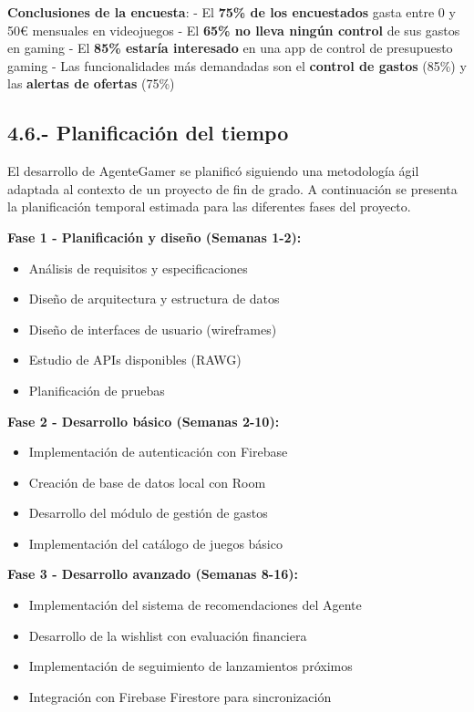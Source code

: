 \documentclass[
  spanish,
  11pt,
  paper=a4,
  ,captions=tableheading
]{scrartcl}
\providecommand{\tightlist}{%
  \setlength{\itemsep}{0pt}\setlength{\parskip}{0pt}}
\begin{document}
\textbf{Conclusiones de la encuesta}: - El \textbf{75\% de los
encuestados} gasta entre 0 y 50€ mensuales en videojuegos - El
\textbf{65\% no lleva ningún control} de sus gastos en gaming - El
\textbf{85\% estaría interesado} en una app de control de presupuesto
gaming - Las funcionalidades más demandadas son el \textbf{control de
gastos} (85\%) y las \textbf{alertas de ofertas} (75\%)

\hypertarget{planificaciuxf3n-del-tiempo}{%
\subsection{4.6.- Planificación del
tiempo}\label{planificaciuxf3n-del-tiempo}}

El desarrollo de AgenteGamer se planificó siguiendo una metodología ágil
adaptada al contexto de un proyecto de fin de grado. A continuación se
presenta la planificación temporal estimada para las diferentes fases
del proyecto.

\textbf{Fase 1 - Planificación y diseño (Semanas 1-2):}

\begin{itemize}
\tightlist
\item
  Análisis de requisitos y especificaciones
\item
  Diseño de arquitectura y estructura de datos
\item
  Diseño de interfaces de usuario (wireframes)
\item
  Estudio de APIs disponibles (RAWG)
\item
  Planificación de pruebas
\end{itemize}

\textbf{Fase 2 - Desarrollo básico (Semanas 2-10):}

\begin{itemize}
\tightlist
\item
  Implementación de autenticación con Firebase
\item
  Creación de base de datos local con Room
\item
  Desarrollo del módulo de gestión de gastos
\item
  Implementación del catálogo de juegos básico
\end{itemize}

\textbf{Fase 3 - Desarrollo avanzado (Semanas 8-16):}

\begin{itemize}
\tightlist
\item
  Implementación del sistema de recomendaciones del Agente
\item
  Desarrollo de la wishlist con evaluación financiera
\item
  Implementación de seguimiento de lanzamientos próximos
\item
  Integración con Firebase Firestore para sincronización
\end{itemize}
\end{document}
